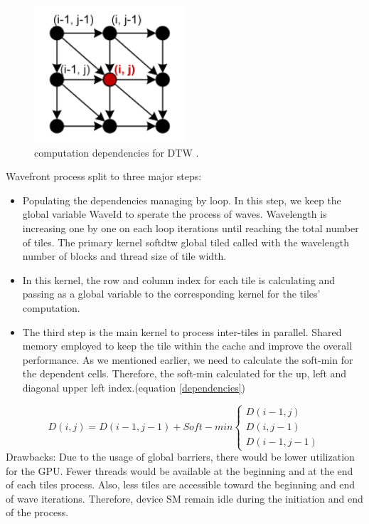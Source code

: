 \documentclass[12pt, letterpaper]{article}
\begin{document}
\begin{figure}[htbp]
\includegraphics[height=2in]{img/tiling_dependencies.png}
\centering
\caption{computation dependencies for DTW \cite{belviranli_peerwave_2015}.}
\label{DTW_dependency}
\end{figure}

Wavefront process split to three major steps:

\begin{itemize}
  \item Populating the dependencies managing by loop. In this step, we keep the
    global variable WaveId to sperate the process of waves. Wavelength is
    increasing one by one on each loop iterations until reaching the total
    number of tiles. The primary kernel softdtw global tiled called with the
    wavelength number of blocks and thread size of tile width.
  \item In this kernel, the row and column index for each tile is calculating
    and passing as a global variable to the corresponding kernel for the tiles’
    computation.
  \item The third step is the main kernel to process inter-tiles in
    parallel. Shared memory employed to keep the tile within the cache and
    improve the overall performance. As we mentioned earlier, we need to
    calculate the soft-min for the dependent cells. Therefore, the soft-min
    calculated for the up, left and diagonal upper left index.(equation
    \ref{dependencies})
\end{itemize}

\begin{equation} \label{dependencies}
  D (i,j) = D(i-1, j-1) + Soft-min
  \begin{cases}
        D(i-1,j) \\
        D(i,j-1)\\
        D(i-1,j-1)
  \end{cases}
\end{equation}
Drawbacks: Due to the usage of global barriers, there would be lower utilization
for the GPU.  Fewer threads would be available at the beginning and at the end
of each tiles process.  Also, less tiles are accessible toward the beginning and
end of wave iterations.  Therefore, device SM remain idle during the initiation
and end of the process.
\end{document}
